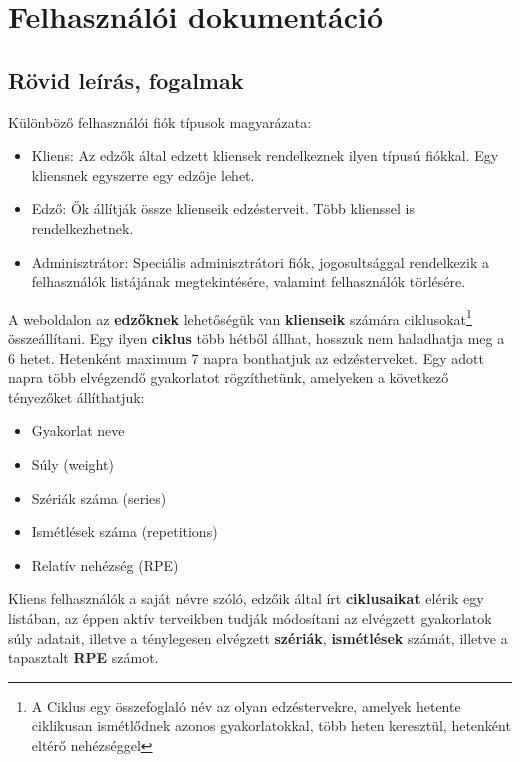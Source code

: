 \chapter{Felhasználói dokumentáció}
\label{ch:user}

\section{Rövid leírás, fogalmak}

Különböző felhasználói fiók típusok magyarázata:

\begin{itemize}
  \item Kliens: Az edzők által edzett kliensek rendelkeznek ilyen típusú fiókkal. Egy kliensnek egyszerre egy edzője lehet.
  \item Edző: Ők állítják össze klienseik edzésterveit. Több klienssel is rendelkezhetnek.
  \item Adminisztrátor: Speciális adminisztrátori fiók, jogosultsággal rendelkezik a felhasználók listájának megtekintésére, valamint felhasználók törlésére. 
\end{itemize}

\bigskip

A weboldalon az \textbf{edzőknek} lehetőségük van \textbf{klienseik} számára ciklusokat\footnote[1]{A Ciklus egy összefoglaló név az olyan edzéstervekre, amelyek hetente ciklikusan ismétlődnek azonos gyakorlatokkal, több heten keresztül, hetenként eltérő nehézséggel} összeállítani. Egy ilyen \textbf{ciklus} több hétből állhat, hosszuk nem haladhatja meg a 6 hetet. Hetenként maximum 7 napra bonthatjuk az edzésterveket.
Egy adott napra több elvégzendő gyakorlatot rögzíthetünk, amelyeken a következő tényezőket állíthatjuk:
\begin{itemize}
  \item Gyakorlat neve
  \item Súly (weight)
  \item Szériák száma (series)
  \item Ismétlések száma (repetitions)
  \item Relatív nehézség (RPE)
\end{itemize}

\bigskip

Kliens felhasználók a saját névre szóló, edzőik által írt \textbf{ciklusaikat} elérik egy listában, az éppen aktív terveikben tudják módosítani az elvégzett gyakorlatok súly adatait, illetve a ténylegesen elvégzett \textbf{szériák}, \textbf{ismétlések} számát, illetve a tapasztalt \textbf{RPE} számot.

